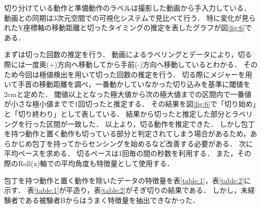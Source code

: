 切り分けている動作と準備動作のラベルは撮影した動画から手入力している．
動画との同期は3次元空間での可視化システムで見比べて行う．
特に変化が見られたY座標軸の移動距離と切ったタイミングの推定を表したグラフが図\ref{fig:6}である．


まずは切った回数の推定を行う．
動画によるラベリングとデータにより，切る際には一度奥(+)方向へ移動してから手前(-)方向へ移動しているとわかる．
そのため今回は極値検出を用いて切った回数の推定を行う．
切る際にメジャーを用いて手首の移動距離を調べ，一番動かしていなかった切り込みを基準に閾値を2cmと定めた．
閾値以上となった極大値から次の極大値までの区間内で一番値が小さな極小値までで1回切ったと推定する．
その結果を図\ref{fig:6}で「切り始め」と「切り終わり」として表している．
結果から切ったと推定した部分とラベリングを行った区間が一致した．
以上より，切る動作を推定できた．
しかし包丁を持つ動作と置く動作も切っている部分と判定されてしまう場合があるため，あらかじめ包丁を持ってからセンシングを始めるなど改善する必要がある．
次に平均ペースを求める．
切るペースは1回毎の間の秒数を利用する．
また，その際のRoll(x)軸での平均角度も特徴量として使用する．


包丁を持つ動作と置く動作を除いたデータの特徴量を表\ref{table:1}，表\ref{table:2}に示す．
表\ref{table:1}が平造り，表\ref{table:2}がそぎ切りの結果である．
しかし，未経験者である被験者Bからはうまく特徴量を抽出できなかった．
\begin{table}[ht]
    \centering
    \caption{平造りの特徴量}
    \label{table:1}
\end{table}

